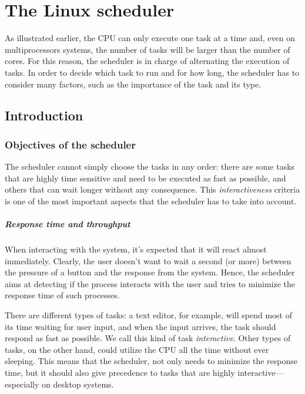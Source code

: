 \chapter{The Linux scheduler} %
\label{ch:sched}

As illustrated earlier, the CPU can only execute one task at a time and, even on multiprocessors systems, the number of tasks will be larger than the number of cores. For this reason, the scheduler is in charge of alternating the execution of tasks. 
In order to decide which task to run and for how long, the scheduler has to consider many factors, such as the importance of the task and its type.

\section{Introduction}%

\subsection{Objectives of the scheduler}

The scheduler cannot simply choose the tasks in any order: there are some tasks that are highly time sensitive and need to be executed as fast as possible, and others that can wait longer without any consequence. This \textit{interactiveness} criteria is one of the most important aspects that the scheduler has to take into account.

\paragraph{Response time and throughput}
When interacting with the system, it's expected that it will react almost
immediately. Clearly, the user doesn't want to wait a second (or more)
between the pressure of a button and the response from the
system. Hence, the scheduler aims at detecting if the process
interacts with the user and tries to minimize the response time of such
processes.

There are different types of tasks: a text editor, for example, will spend most of its time waiting for user input, and when the input arrives, the task should respond as fast as possible. We call this kind of task \textit{interactive}. Other types of tasks, on the other hand, could utilize the CPU all the time without ever sleeping.
This means that the scheduler, not only needs to minimize the response time, but it should also give precedence to tasks that are highly interactive---especially on desktop systems.

